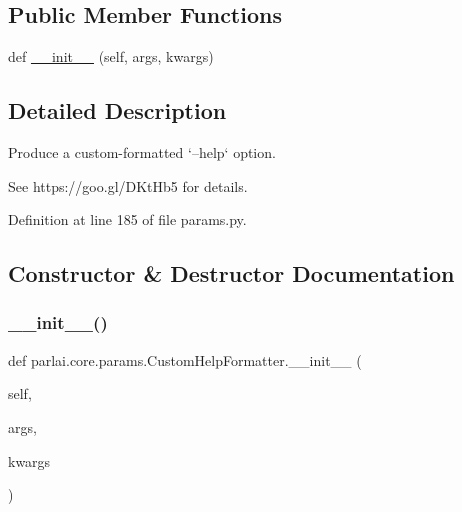 \subsection*{Public Member Functions}
\begin{DoxyCompactItemize}
\item 
def \hyperlink{classparlai_1_1core_1_1params_1_1CustomHelpFormatter_a4111203088995f375f8679fee61020b0}{\+\_\+\+\_\+init\+\_\+\+\_\+} (self, args, kwargs)
\end{DoxyCompactItemize}


\subsection{Detailed Description}
\begin{DoxyVerb}Produce a custom-formatted `--help` option.

See https://goo.gl/DKtHb5 for details.
\end{DoxyVerb}
 

Definition at line 185 of file params.\+py.



\subsection{Constructor \& Destructor Documentation}
\mbox{\label{classparlai_1_1core_1_1params_1_1CustomHelpFormatter_a4111203088995f375f8679fee61020b0}} 
\subsubsection{\texorpdfstring{\+\_\+\+\_\+init\+\_\+\+\_\+()}{\_\_init\_\_()}}
{\footnotesize\ttfamily def parlai.\+core.\+params.\+Custom\+Help\+Formatter.\+\_\+\+\_\+init\+\_\+\+\_\+ (\begin{DoxyParamCaption}\item[{}]{self,  }\item[{}]{args,  }\item[{}]{kwargs }\end{DoxyParamCaption})}



